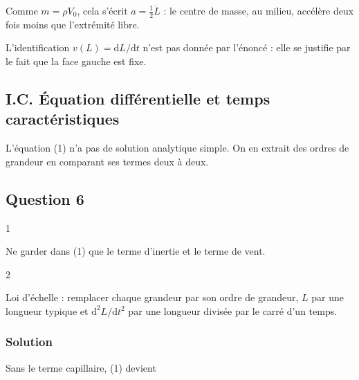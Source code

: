 \documentclass[11pt,a4paper]{article}
\newcommand{\equationajustee}[1]{%
  \sbox{\boiteequation}{$\displaystyle #1$}%
  \ifdim\wd\boiteequation>\linewidth
    \[\resizebox{\linewidth}{!}{\usebox{\boiteequation}}\]%
  \else
    \[#1\]%
  \fi}
\begin{document}
\equationajustee{\boxed{m\,a(t) = \frac{\rho V_0}{2}\,\frac{{\mathrm{d}}^2L}{\mathrm{d}t^2}(t)}}

Comme \(m = \rho V_0\), cela s'écrit \(a = \frac12\ddot L\) : le centre de masse, au milieu, accélère deux fois moins que l'extrémité libre.

\begin{piege}

L'identification \(v(L) = \mathrm{d}L/\mathrm{d}t\) n'est pas donnée par l'énoncé : elle se justifie par le fait que la face gauche est fixe.

\end{piege}

\hypertarget{i.c.-uxe9quation-diffuxe9rentielle-et-temps-caractuxe9ristiques}{%
\subsection{I.C. Équation différentielle et temps caractéristiques}\label{i.c.-uxe9quation-diffuxe9rentielle-et-temps-caractuxe9ristiques}}

L'équation (1) n'a pas de solution analytique simple. On en extrait des ordres de grandeur en comparant ses termes deux à deux.

\hypertarget{question-6}{%
\subsection{Question 6}\label{question-6}}

\begin{indication}{1}

Ne garder dans (1) que le terme d'inertie et le terme de vent.

\end{indication}

\begin{indication}{2}

Loi d'échelle : remplacer chaque grandeur par son ordre de grandeur, \(L\) par une longueur typique et \({\mathrm{d}}^2L/\mathrm{d}t^2\) par une longueur divisée par le carré d'un temps.

\end{indication}

\hypertarget{solution-5}{%
\subsubsection{Solution}\label{solution-5}}

Sans le terme capillaire, (1) devient
\end{document}
